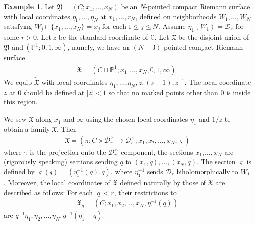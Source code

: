 \documentclass[12pt,a4paper,notitlepage]{article}
\theoremstyle{definition}
\newtheorem{eg}[df]{Example}
\theoremstyle{plain}
\newcommand{\fk}{\mathfrak}
\newcommand{\mc}{\mathcal}
\newcommand{\wtd}{\widetilde}
\newcommand{\sgm}{\varsigma}
\newcommand{\Cbb}{\mathbb C}
\newcommand{\Pbb}{\mathbb P}
\numberwithin{equation}{section}
\begin{document}
\begin{eg}\label{lb9}
Let $\fk Y=(C;x_1,\dots,x_N)$ be an $N$-pointed compact Riemann surface with local coordinates $\eta_1,\dots,\eta_N$ at $x_1,\dots,x_N$, defined on neighborhoods $W_1,\dots,W_N$ satisfying $W_j\cap\{x_1,\dots,x_N\}=x_j$ for each $1\leq j\leq N$. Assume $\eta_1(W_1)=\mc D_r$ for some $r>0$. Let $z$ be the standard coordinate of $\Cbb$. Let $\wtd{\fk X}$ be the disjoint union of $\fk Y$ and $(\Pbb^1;0,1,\infty)$, namely, we have an $(N+3)$-pointed compact Riemann surface
\begin{align*}
\wtd{\fk X}=(C\sqcup \Pbb^1;x_1,\dots,x_N,0,1,\infty).	
\end{align*}
We equip $\wtd{\fk X}$ with local coordinates $\eta_1,\dots,\eta_N,z,(z-1),z^{-1}$. The local coordinate $z$ at $0$ should be defined at $|z|<1$ so that no marked points other than $0$ is inside this region.

We sew $\wtd{\fk X}$ along $x_1$ and $\infty$ using the chosen local coordinates $\eta_1$ and $1/z$ to obtain a family $\fk X$. Then
\begin{align*}
\fk X=(\pi: C\times\mc D_r^\times\rightarrow\mc D_r^\times;x_1,x_2,\dots,x_N,\sgm)	
\end{align*}
where $\pi$ is the projection onto the $\mc D_r^\times$-component, the sections $x_1,\dots,x_N$ are (rigorously speaking) sections sending $q$ to $(x_1,q),\dots,(x_N,q)$. The section $\sgm$ is defined by $\sgm(q)=(\eta_1^{-1}(q),q)$, where $\eta_1^{-1}$ sends $\mc D_r$ biholomorphically to $W_1$. Moreover, the local coordinates of $\fk X$ defined naturally by those of $\wtd{\fk X}$ are described as follows: For each $|q|<r$, their restrictions to
\begin{align}
\fk X_q=(C;x_1,x_2,\dots,x_N,\eta_1^{-1}(q))  \label{eq31}	
\end{align}
are $q^{-1}\eta_1,\eta_2,\dots,\eta_N,q^{-1}(\eta_1-q)$. 


\end{eg}
\end{document}
